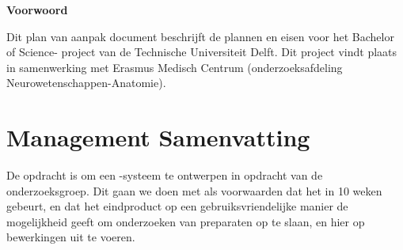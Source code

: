 \begin{center}
\textbf{\large Voorwoord}
\end{center}



Dit plan van aanpak document beschrijft de plannen en eisen voor het Bachelor of Science- project \casam van de Technische Universiteit Delft.
Dit project vindt plaats in samenwerking met Erasmus Medisch Centrum (onderzoeksafdeling Neurowetenschappen-Anatomie).

\section*{Management Samenvatting}


De opdracht is om een \casam-systeem te ontwerpen in opdracht van de \casam onderzoeksgroep.
Dit gaan we doen met als voorwaarden dat het in 10 weken gebeurt, en dat het eindproduct op een gebruiksvriendelijke manier de mogelijkheid geeft om onderzoeken van preparaten op te slaan, en hier op bewerkingen uit te voeren.
